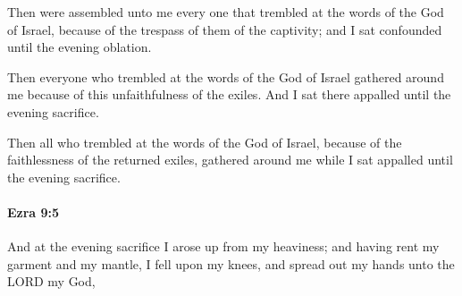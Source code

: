 			\begin{versebox}
					\item[BHS] 
					\item[LXX] 
					\item[ASV] Then were assembled unto me every one that trembled at the words of the God of Israel, because of the trespass of them of the captivity; and I sat confounded until the evening oblation.
					\item[NIV] Then everyone who trembled at the words of the God of Israel gathered around me because of this unfaithfulness of the exiles. And I sat there appalled until the evening sacrifice.
					\item[NRSV] Then all who trembled at the words of the God of Israel, because of the faithlessness of the returned exiles, gathered around me while I sat appalled until the evening sacrifice.
			\end{versebox}

		\paragraph{Ezra 9:5} %
			\label{EZRA-9-5}

			And at the evening sacrifice I arose up from my heaviness; and having rent my garment and my mantle, I fell upon my knees, and spread out my hands unto the LORD my God,

